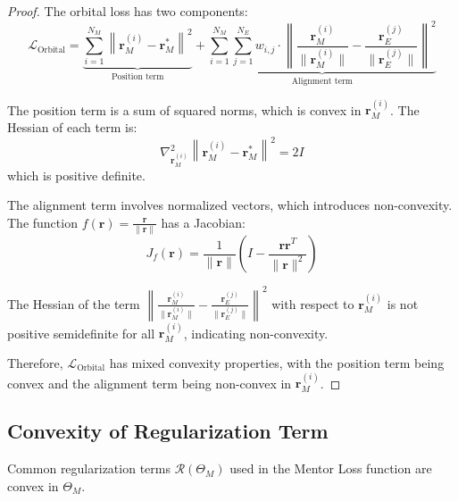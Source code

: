 \begin{proof}
The orbital loss has two components:
\begin{equation}
\mathcal{L}_{\text{Orbital}} = \underbrace{\sum_{i=1}^{N_M} \left\|\mathbf{r}_M^{(i)} - \mathbf{r}_M^{*}\right\|^2}_{\text{Position term}} + \underbrace{\sum_{i=1}^{N_M} \sum_{j=1}^{N_E} w_{i,j} \cdot \left\|\frac{\mathbf{r}_M^{(i)}}{\|\mathbf{r}_M^{(i)}\|} - \frac{\mathbf{r}_E^{(j)}}{\|\mathbf{r}_E^{(j)}\|}\right\|^2}_{\text{Alignment term}}
\end{equation}

The position term is a sum of squared norms, which is convex in $\mathbf{r}_M^{(i)}$. The Hessian of each term is:
\begin{equation}
\nabla^2_{\mathbf{r}_M^{(i)}} \left\|\mathbf{r}_M^{(i)} - \mathbf{r}_M^{*}\right\|^2 = 2I
\end{equation}
which is positive definite.

The alignment term involves normalized vectors, which introduces non-convexity. The function $f(\mathbf{r}) = \frac{\mathbf{r}}{\|\mathbf{r}\|}$ has a Jacobian:
\begin{equation}
J_f(\mathbf{r}) = \frac{1}{\|\mathbf{r}\|}\left(I - \frac{\mathbf{r}\mathbf{r}^T}{\|\mathbf{r}\|^2}\right)
\end{equation}

The Hessian of the term $\left\|\frac{\mathbf{r}_M^{(i)}}{\|\mathbf{r}_M^{(i)}\|} - \frac{\mathbf{r}_E^{(j)}}{\|\mathbf{r}_E^{(j)}\|}\right\|^2$ with respect to $\mathbf{r}_M^{(i)}$ is not positive semidefinite for all $\mathbf{r}_M^{(i)}$, indicating non-convexity.

Therefore, $\mathcal{L}_{\text{Orbital}}$ has mixed convexity properties, with the position term being convex and the alignment term being non-convex in $\mathbf{r}_M^{(i)}$.
\end{proof}

\subsection{Convexity of Regularization Term}

\begin{theorem}
Common regularization terms $\mathcal{R}(\Theta_M)$ used in the Mentor Loss function are convex in $\Theta_M$.
\end{theorem}

